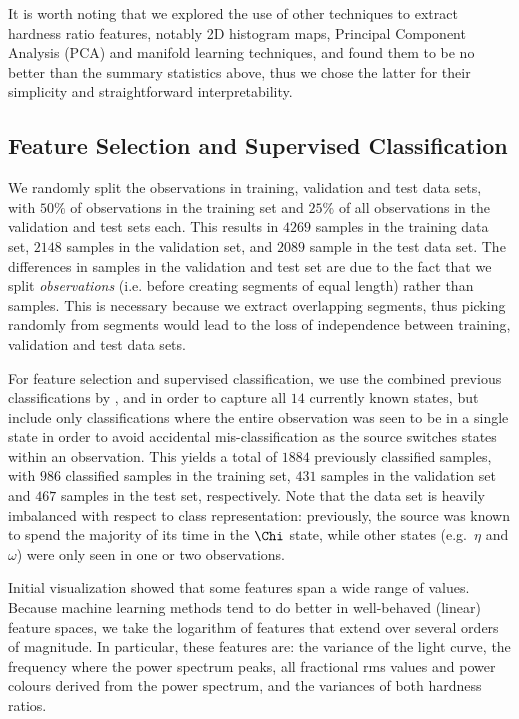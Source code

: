 \documentclass[12pt]{emulateapj}
\begin{document}
It is worth noting that we explored the use of other techniques to extract hardness ratio features, notably 2D histogram maps, Principal Component Analysis (PCA) and manifold learning techniques, and found them to be no better than the summary statistics above, thus we chose the latter for their simplicity and straightforward interpretability. 


\subsection{Feature Selection and Supervised Classification}
\label{sec:featureselection}

We randomly split the observations in training, validation and test data sets, with $50\%$ of observations in the training set and $25\%$ of all observations in the validation and test sets each. This results in $4269$ samples in the training data set, $2148$ samples in the validation set, and $2089$ sample in the test data set.  The differences in samples in the validation and test set are due to the fact that we split \textit{observations} (i.e. before creating segments of equal length) rather than samples. This is necessary because we extract overlapping segments, thus picking randomly from segments would lead to the loss of independence between training, validation and test data sets. 

For feature selection and supervised classification, we use the combined previous classifications by \citet{belloni2000}, \citet{kleinwolt2002} and \citet{hannikainen2003} in order to capture all $14$ currently known states, but include only classifications where the entire observation was seen to be in a single state in order to avoid accidental mis-classification as the source switches states within an observation. This yields a total of $1884$ previously classified samples, with $986$ classified samples in the training set, $431$ samples in the validation set and $467$ samples in the test set, respectively. Note that the data set is heavily imbalanced with respect to class representation: previously, the source was known to spend the majority of its time in the $\Chi$ state, while other states (e.g.\ $\eta$ and $\omega$) were only seen in one or two observations. 

Initial visualization showed that some features span a wide range of values. Because machine learning methods tend to do better in well-behaved (linear) feature spaces, we take the logarithm of features that extend over several orders of magnitude. In particular, these features are: the variance of the light curve, the frequency where the power spectrum peaks, all fractional rms values and power colours derived from the power spectrum, and the variances of both hardness ratios. 
\end{document}
